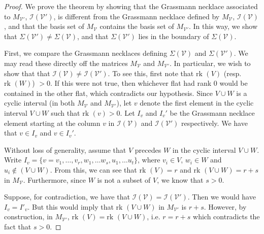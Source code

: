 \documentclass[11pt]{article}
\newcommand{\rk}{\textrm{rk }}
\newcommand{\cV}{\mathcal{V}}
\newcommand{\cI}{\mathcal{I}}
\newcommand{\cB}{\mathcal{B}}
\theoremstyle{remark}
\theoremstyle{definition}
\begin{document}
\begin{proof} 
We prove the theorem by showing that the Grassmann necklace associated to $M_{\cV'}$, $\cI(\cV')$, is different from the Grassmann necklace defined by $M_{\cV}$, $\cI(\cV)$, and that the basis set of $M_{\cV}$ contains the basis set of $M_{\cV'}$. In this way, we show that $\Sigma(\cV') \neq \Sigma(\cV)$, and that  $\Sigma(\cV')$ lies in the boundary of $\Sigma(\cV)$. 

First, we compare the Grassmann necklaces defining $\Sigma(\cV)$ and $\Sigma(\cV')$. We may read these directly off the matrices $M_{\cV}$ and $M_{\cV'}$. In particular, we wish to show that that $\cI(\cV) \neq \cI(\cV')$. To see this, first note that $\rk(V)$ (resp. $\rk(W)$) $>0$. If this were not true, then whichever flat had rank $0$ would be contained in the other flat, which contradicts our hypothesis. Since $V \cup W$ is a cyclic interval (in both $M_\cV$ and $M_{\cV'}$), let $v$ denote the first element in the cyclic interval $V\cup W$ such that $\rk(v) >0$. Let $I_v$ and $I_v'$ be the Grassmann necklace element starting at the column $v$ in $\cI(\cV)$ and $\cI(\cV')$ respectively. We have that $v \in I_v$ and $v \in I_v'$. 

Without loss of generality, assume that $V$ precedes $W$ in the cyclic interval $V \cup W$. Write $I_v = \{v = v_1, \ldots, v_r, w_1, \ldots w_s, u_1, \ldots u_t\}$, where $v_i \in V$, $w_i \in W$ and $u_i \not \in (V \cup W)$. From this, we can see that $\rk(V) = r$ and $\rk(V\cup W) = r+s$ in $M_\cV$. Furthermore, since $W$ is not a subset of $V$, we know that $s > 0$. 

Suppose, for contradiction, we have that $\cI(\cV) = \cI(\cV')$. Then we would have $I_v = I'_v$. But this would imply that $\rk(V \cup W)$ in $M_{\cV'}$ is $r+ s$. However, by construction, in $M_{\cV'}$, $\rk(V) = \rk(V\cup W)$, i.e. $r = r+s$ which contradicts the fact that $s > 0$. 

\begin{comment}
Note that some vertex of $V$ (resp. $W$)  appears at least once in $\cI(C)$. To see this, note that any element that does not ever appear in $\cI(C)$ has rank $0$. Since neither $V$ nor $W$ has rank $0$, they must each contain at least one element that appears in $\cI(C)$. Therefore, we know that there exists some $I_j \in \cI(C)$ such that $I_j \cap W \neq \emptyset$. Fix such a $j$ and let $a \in  I_j \cap W$ be an element of $W$ that is in said $I_j$. Let $I'_j$ be the corresponding element of $\cI(C')$. We claim that $I_j \neq I_j'$. That is, the $j^{th}$ minor in $\cI(C')$ is not the same as the $j^{th}$ minor of $\cI(C)$. This shows that $M(C)$ and $M(C')$ define two different positroid cells. Then it remains to show that the the basis set $\cB$ of $M(C)$ contains the basis set $\cB'$ of $M(C')$. 


\end{comment}
\end{proof}
\end{document}
